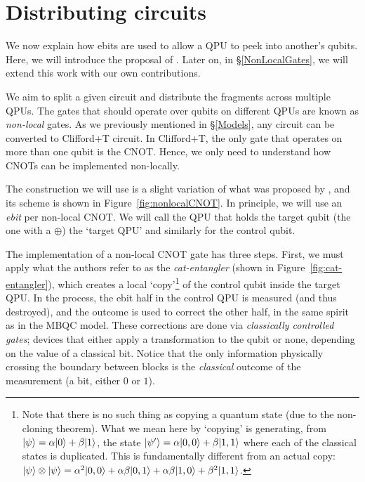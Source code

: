 \section{Distributing circuits}
\label{IntroDistributing}

We now explain how ebits are used to allow a QPU to peek into another's qubits. Here, we will introduce the proposal of \citet{NonLocalCNOT}. Later on, in \S\ref{NonLocalGates}, we will extend this work with our own contributions. 

We aim to split a given circuit and distribute the fragments across multiple QPUs. The gates that should operate over qubits on different QPUs are known as \textit{non-local} gates. As we previously mentioned in \S\ref{Models}, any circuit can be converted to Clifford+T circuit. In Clifford+T, the only gate that operates on more than one qubit is the CNOT. Hence, we only need to understand how CNOTs can be implemented non-locally.

The construction we will use is a slight variation of what was proposed by \citet{NonLocalCNOT}, and its scheme is shown in Figure~\ref{fig:nonlocalCNOT}. In principle, we will use an \textit{ebit} per non-local CNOT. We will call the QPU that holds the target qubit (the one with a \(\oplus\)) the `target QPU' and similarly for the control qubit. 



The implementation of a non-local CNOT gate has three steps. First, we must apply what the authors refer to as the \textit{cat-entangler} (shown in Figure~\ref{fig:cat-entangler}), which creates a local `copy'\footnote{Note that there is no such thing as copying a quantum state (due to the non-cloning theorem). What we mean here by `copying' is generating, from \(\vert \psi \rangle = \alpha\vert 0 \rangle + \beta\vert 1 \rangle\), the state \(\vert \psi' \rangle = \alpha\vert 0,0 \rangle + \beta\vert 1,1 \rangle\) where each of the classical states is duplicated. This is fundamentally different from an actual copy: \(\vert \psi \rangle\otimes\vert \psi \rangle = \alpha^2\vert 0,0 \rangle + \alpha\beta\vert 0,1 \rangle + \alpha\beta\vert 1,0 \rangle + \beta^2\vert 1,1 \rangle\).} of the control qubit inside the target QPU. In the process, the ebit half in the control QPU is measured (and thus destroyed), and the outcome is used to correct the other half, in the same spirit as in the MBQC model. These corrections are done via \textit{classically controlled gates}; devices that either apply a transformation to the qubit or none, depending on the value of a classical bit. Notice that the only information physically crossing the boundary between blocks is the \textit{classical} outcome of the measurement (a bit, either \(0\) or \(1\)).

